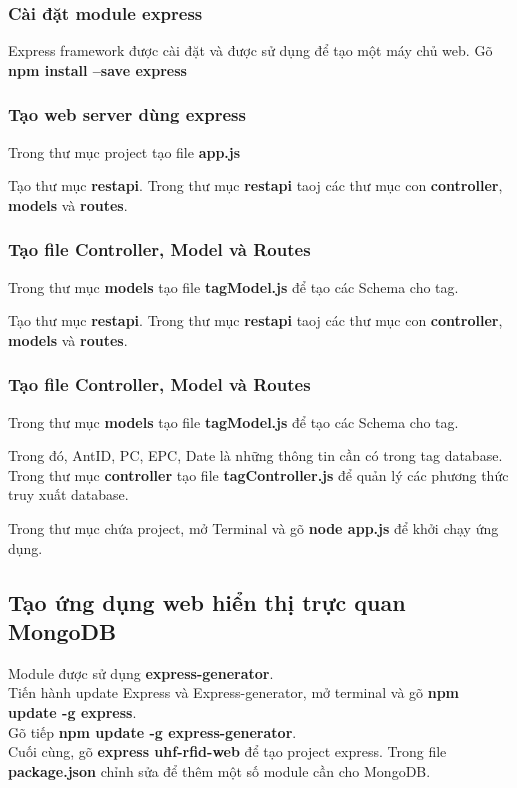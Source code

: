 \subsubsection{Cài đặt module express}
Express framework được cài đặt và được sử dụng để tạo một máy chủ web.
Gõ \textbf{npm install --save express}
\label{ref{fig4_7}}

\subsubsection{Tạo web server dùng express}
Trong thư mục project tạo file \textbf{app.js} 

Tạo thư mục \textbf{restapi}. Trong thư mục \textbf{restapi} taoj các thư mục con \textbf{controller}, \textbf{models} và \textbf{routes}.
\subsubsection{Tạo file Controller, Model và Routes}
Trong thư mục \textbf{models} tạo file  \textbf{tagModel.js} để tạo các Schema cho tag.

Tạo thư mục \textbf{restapi}. Trong thư mục \textbf{restapi} taoj các thư mục con \textbf{controller}, \textbf{models} và \textbf{routes}.
\subsubsection{Tạo file Controller, Model và Routes}
Trong thư mục \textbf{models} tạo file  \textbf{tagModel.js} để tạo các Schema cho tag.


Trong đó, AntID, PC, EPC, Date là những thông tin cần có trong tag database.\\

Trong thư mục \textbf{controller} tạo file  \textbf{tagController.js} để quản lý các phương thức truy xuất database.

Trong thư mục chứa project, mở Terminal và gõ \textbf{node app.js} để khởi chạy ứng dụng.
\label{ref{fig4_8}}

\subsection{Tạo ứng dụng web hiển thị trực quan MongoDB}
Module được sử dụng \textbf{express-generator}.\\
Tiến hành update Express và Express-generator, mở terminal và gõ \textbf{npm update -g express}.\\
Gõ tiếp \textbf{npm update -g express-generator}.\\
Cuối cùng, gõ \textbf{express uhf-rfid-web} để tạo project express.
Trong file \textbf{package.json} chỉnh sửa để thêm một số module cần cho MongoDB.
\label{ref{fig4_9}}

